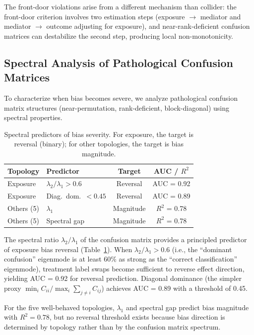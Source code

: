 \documentclass[11pt]{article}
\begin{document}
The front-door violations arise from a different mechanism than collider: the front-door criterion involves two estimation steps (exposure $\to$ mediator and mediator $\to$ outcome adjusting for exposure), and near-rank-deficient confusion matrices can destabilize the second step, producing local non-monotonicity.

\subsection{Spectral Analysis of Pathological Confusion Matrices}\label{sec:spectral}

To characterize when bias becomes severe, we analyze pathological confusion matrix structures (near-permutation, rank-deficient, block-diagonal) using spectral properties.

\begin{table}[t]
\centering
\caption{Spectral predictors of bias severity. For exposure, the target is reversal (binary); for other topologies, the target is bias magnitude.}
\label{tab:spectral}
\small
\begin{tabular}{llcc}
\toprule
Topology & Predictor & Target & AUC / $R^2$ \\
\midrule
Exposure & $\lambda_2/\lambda_1 > 0.6$ & Reversal & AUC = 0.92 \\
Exposure & Diag.\ dom.\ $< 0.45$ & Reversal & AUC = 0.89 \\
Others (5) & $\lambda_1$ & Magnitude & $R^2$ = 0.78 \\
Others (5) & Spectral gap & Magnitude & $R^2$ = 0.78 \\
\bottomrule
\end{tabular}
\end{table}

The spectral ratio $\lambda_2/\lambda_1$ of the confusion matrix provides a principled predictor of exposure bias reversal (Table~\ref{tab:spectral}).
When $\lambda_2/\lambda_1 > 0.6$ (i.e., the ``dominant confusion'' eigenmode is at least 60\% as strong as the ``correct classification'' eigenmode), treatment label swaps become sufficient to reverse effect direction, yielding AUC = 0.92 for reversal prediction.
Diagonal dominance (the simpler proxy $\min_i C_{ii} / \max_i \sum_{j \neq i} C_{ij}$) achieves AUC = 0.89 with a threshold of 0.45.

For the five well-behaved topologies, $\lambda_1$ and spectral gap predict bias magnitude with $R^2 = 0.78$, but no reversal threshold exists because bias direction is determined by topology rather than by the confusion matrix spectrum.
\end{document}
